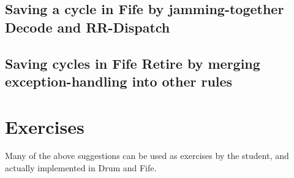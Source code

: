 
\subsection{Saving a cycle in Fife by jamming-together Decode and RR-Dispatch}


\subsection{Saving cycles in Fife Retire by merging exception-handling into other rules}


\section{Exercises}

Many of the above suggestions can be used as exercises by the student,
and actually implemented in Drum and Fife.

